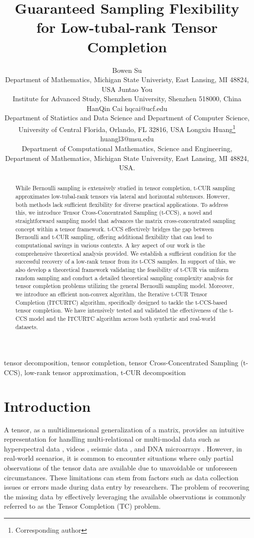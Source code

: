 \documentclass[twoside,12pt]{article}
\title{Guaranteed Sampling Flexibility for Low-tubal-rank Tensor Completion}
\author{\name Bowen Su \email {subowen@msu.edu}\\
\addr Department of Mathematics,  
    Michigan State Univeristy, East Lansing, MI 48824, USA 
\AND
\name Juntao You \email {jtyou@szu.edu.cn}\\ \addr Institute for Advanced Study, Shenzhen University, Shenzhen 518000, China
\AND 
HanQin Cai \email hqcai@ucf.edu \\ \addr Department of Statistics and Data Science and Department of Computer Science, University of Central Florida,  Orlando, FL 32816, USA
 \AND
 Longxiu Huang\thanks{Corresponding author} \email huangl3@msu.edu\\
\addr 
Department of Computational Mathematics, Science and Engineering, Department of Mathematics, Michigan State University, East Lansing, MI 48824, USA.
}
\begin{document}
\maketitle

 
\begin{abstract}
While Bernoulli sampling is extensively studied in tensor completion, t-CUR sampling approximates low-tubal-rank tensors  %
via lateral and horizontal subtensors. However, both methods lack sufficient flexibility for diverse practical applications. To address this, we introduce Tensor Cross-Concentrated Sampling (t-CCS), a novel and straightforward sampling model that advances the matrix cross-concentrated sampling concept within a tensor framework. t-CCS effectively bridges the gap between Bernoulli and t-CUR sampling, offering additional flexibility that can lead to computational savings in various contexts. 
A key aspect of our work is the comprehensive theoretical analysis provided. We establish a sufficient condition for the successful recovery of a low-rank tensor from its t-CCS samples. In support of this, we also develop a theoretical framework validating the feasibility of t-CUR via uniform random sampling and conduct a detailed theoretical sampling complexity analysis for tensor completion problems utilizing the general Bernoulli sampling model. 
Moreover, we introduce an efficient non-convex algorithm, the Iterative t-CUR Tensor Completion (ITCURTC) algorithm, specifically designed to tackle the   t-CCS-based tensor completion. We have intensively tested and validated the effectiveness of the t-CCS model and the ITCURTC algorithm across both synthetic and real-world datasets.
\end{abstract}
 \begin{keywords}
tensor decomposition, tensor completion, tensor Cross-Concentrated Sampling (t-CCS), low-rank tensor approximation, t-CUR decomposition
\end{keywords}
\section{Introduction}
  A tensor, as a multidimensional generalization of a matrix, provides an intuitive representation for handling multi-relational or multi-modal data such as hyperspectral data \citep{cai2021mode,yang2020remote,
zheng2019mixed}, videos \citep{Liu2013Tensor, sobral2017matrix}, seismic data \citep{Kilmer2015,popa2021improved}, and DNA microarrays \citep{omberg2007tensor}. However, in real-world scenarios, it is common to encounter situations where only partial observations of the tensor data are available due to unavoidable or unforeseen circumstances. These limitations can stem from factors such as data collection issues or errors made during data entry by researchers. The problem of recovering the missing data by effectively leveraging the available observations is commonly referred to as the Tensor Completion (TC) problem.
\end{document}
